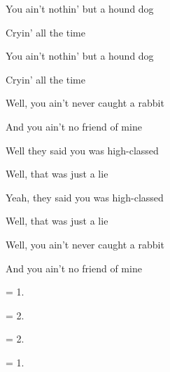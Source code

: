 

\zs
You ain't nothin' but a hound dog

Cryin' all the time

You ain't nothin' but a hound dog

Cryin' all the time

Well, you ain't never caught a rabbit

And you ain't no friend of mine
\ks

\zs
Well they said you was high-classed
 
Well, that was just a lie

Yeah, they said you was high-classed

Well, that was just a lie

Well, you ain't never caught a rabbit

And you ain't no friend of mine
\ks

\zs
= 1.
\ks

\zs
= 2.
\ks

\zs
= 2.
\ks

\zs
= 1.
\ks

\kp
